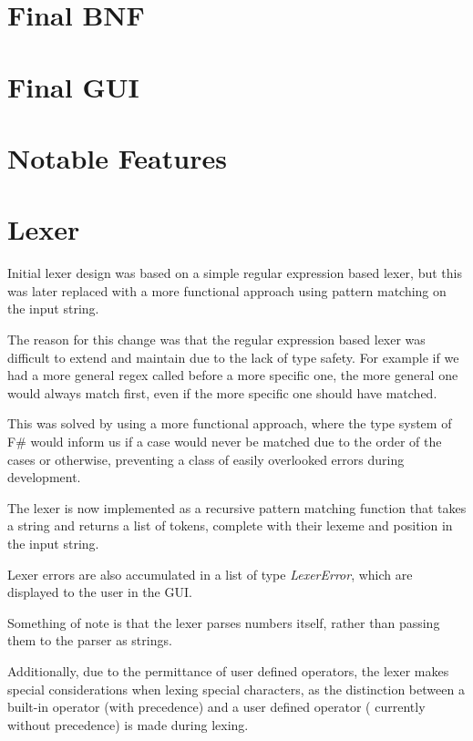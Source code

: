 \section{Final BNF}\label{sec:final-bnf}

\section{Final GUI}\label{sec:final-gui}

\section{Notable Features}\label{sec:notable-features}

\section{Lexer}\label{sec:lexer}

Initial lexer design was based on a simple regular expression based lexer, but this was later replaced with a more
functional approach using pattern matching on the input string.

The reason for this change was that the regular expression based lexer was difficult to extend and maintain due to 
the lack of type safety.
For example if we had a more general regex called before a more specific one, the more general one would always match
first, even if the more specific one should have matched.

This was solved by using a more functional approach, where the type system of F\# would inform us if a case would 
never be matched due to the order of the cases or otherwise, preventing a class of easily overlooked errors during development.

The lexer is now implemented as a recursive pattern matching function that takes a string and returns a list of 
tokens, complete with their lexeme and position in the input string.

Lexer errors are also accumulated in a list of type \textit{LexerError}, which are displayed to the user in the GUI\@.

Something of note is that the lexer parses numbers itself, rather than passing them to the parser as strings.

Additionally, due to the permittance of user defined operators, the lexer makes special considerations when lexing 
special characters, as the distinction between a built-in operator (with precedence) and a user defined operator (
currently without precedence) is made during lexing.

